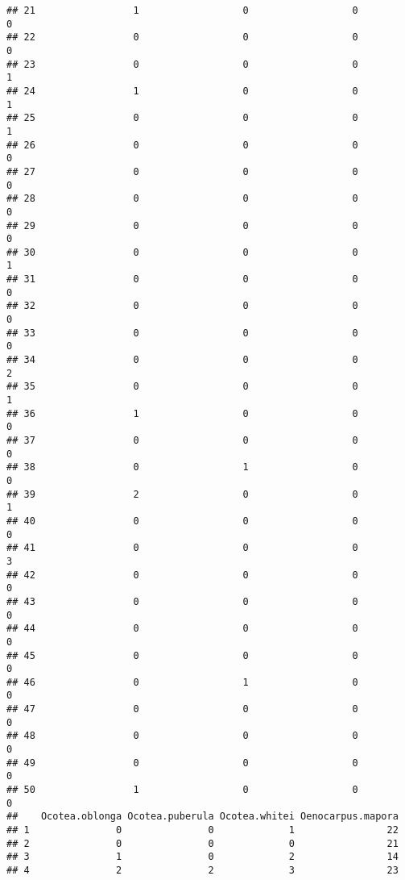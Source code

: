 \documentclass[
]{article}
\begin{document}
\begin{verbatim}
## 21                 1                  0                  0             0
## 22                 0                  0                  0             0
## 23                 0                  0                  0             1
## 24                 1                  0                  0             1
## 25                 0                  0                  0             1
## 26                 0                  0                  0             0
## 27                 0                  0                  0             0
## 28                 0                  0                  0             0
## 29                 0                  0                  0             0
## 30                 0                  0                  0             1
## 31                 0                  0                  0             0
## 32                 0                  0                  0             0
## 33                 0                  0                  0             0
## 34                 0                  0                  0             2
## 35                 0                  0                  0             1
## 36                 1                  0                  0             0
## 37                 0                  0                  0             0
## 38                 0                  1                  0             0
## 39                 2                  0                  0             1
## 40                 0                  0                  0             0
## 41                 0                  0                  0             3
## 42                 0                  0                  0             0
## 43                 0                  0                  0             0
## 44                 0                  0                  0             0
## 45                 0                  0                  0             0
## 46                 0                  1                  0             0
## 47                 0                  0                  0             0
## 48                 0                  0                  0             0
## 49                 0                  0                  0             0
## 50                 1                  0                  0             0
##    Ocotea.oblonga Ocotea.puberula Ocotea.whitei Oenocarpus.mapora
## 1               0               0             1                22
## 2               0               0             0                21
## 3               1               0             2                14
## 4               2               2             3                23

\end{verbatim}
\end{document}
